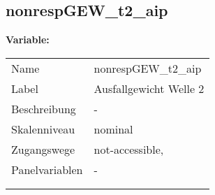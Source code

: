 	
	
	\subsection{nonrespGEW\_t2\_aip}
	\label{subSection:nonrespGEW_t2_aip}

	\noindent\textbf{Variable:}\\
		\begin{tabular}{lL{11.3cm}}
			\label{tableVariable:nonrespGEW_t2_aip}
			Name & nonrespGEW\_t2\_aip \\
			Label & Ausfallgewicht Welle 2 \\
			Beschreibung & - \\
			Skalenniveau & nominal \\
			Zugangswege &
				not-accessible,
 \\
			Panelvariablen & -
			 \\
			 \\
 \\
		\end{tabular}






	
	\newpage
